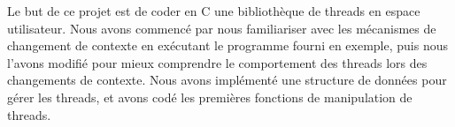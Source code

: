 

Le but de ce projet est de coder en C une bibliothèque de threads en
espace utilisateur. Nous avons commencé par nous familiariser avec les
mécanismes de changement de contexte en exécutant le programme fourni
en exemple, puis nous l'avons modifié pour mieux comprendre le
comportement des threads lors des changements de contexte. Nous avons
implémenté une structure de données pour gérer les threads, et avons
codé les premières fonctions de manipulation de threads.
